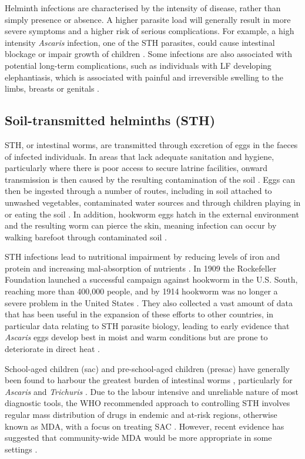 Helminth infections are characterised by the intensity of disease, rather than simply presence or absence. A higher parasite load will generally result in more severe symptoms and a higher risk of serious complications. For example, a high intensity \textit{Ascaris} infection, one of the STH parasites, could cause intestinal blockage or impair growth of children \cite{WHO}. Some infections are also associated with potential long-term complications, such as individuals with LF developing elephantiasis, which is associated with painful and irreversible swelling to the limbs, breasts or genitals \cite{WHO2019_FactSheet}. 

\subsection{Soil-transmitted helminths (STH)}

STH, or intestinal worms, are transmitted through excretion of eggs in the faeces of infected individuals. In areas that lack adequate sanitation and hygiene, particularly where there is poor access to secure latrine facilities, onward transmission is then caused by the resulting contamination of the soil \cite{Bethony2006}. Eggs can then be ingested through a number of routes, including in soil attached to unwashed vegetables, contaminated water sources and through children playing in or eating the soil \cite{WHO}. In addition, hookworm eggs hatch in the external environment and the resulting worm can pierce the skin, meaning infection can occur by walking barefoot through contaminated soil \cite{Bethony2006,Truscott2017}.

STH infections lead to nutritional impairment by reducing levels of iron and protein and increasing mal-absorption of nutrients \cite{WHO}. In 1909 the Rockefeller Foundation launched a successful campaign against hookworm in the U.S. South, reaching more than 400,000 people, and by 1914 hookworm was no longer a severe problem in the United States \cite{Rockefeller1914}. They also collected a vast amount of data that has been useful in the expansion of these efforts to other countries, in particular data relating to STH parasite biology, leading to early evidence that \textit{Ascaris} eggs develop best in moist and warm conditions but are prone to deteriorate in direct heat \cite{Caldwell1928}.

School-aged children (\acrshort{sac}) and pre-school-aged children (\acrshort{presac}) have generally been found to harbour the greatest burden of intestinal worms \cite{Hotez2008}, particularly for \textit{Ascaris} and \textit{Trichuris} \cite{Anderson2015}. Due to the labour intensive and unreliable nature of most diagnostic tools, the WHO recommended approach to controlling STH involves regular mass distribution of drugs in endemic and at-risk regions, otherwise known as MDA, with a focus on treating SAC  \cite{WHO2017STH}. However, recent evidence has suggested that community-wide MDA would be more appropriate in some settings \cite{Anderson2015,Farrell2018}.


